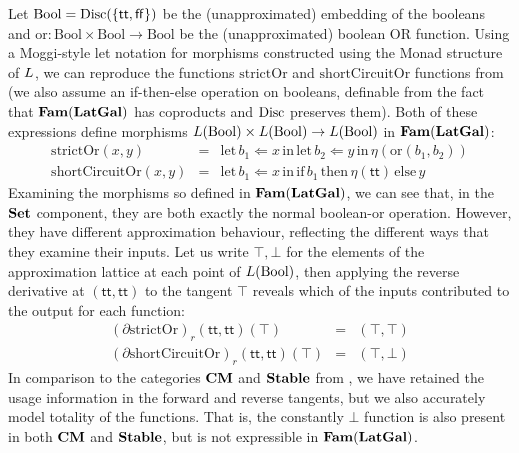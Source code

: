 \newcommand{\Bool}{\mathrm{Bool}}

Let $\Bool = \Disc(\{\mathsf{tt},\mathsf{ff}\})$ be the
(unapproximated) embedding of the booleans and
$\mathrm{or} : \Bool \times \Bool \to \Bool$ be the (unapproximated)
boolean OR function. Using a Moggi-style let notation
\cite{notions-of-computation} for morphisms constructed using the
Monad structure of $L$, we can reproduce the functions
$\mathrm{strictOr}$ and $\mathrm{shortCircuitOr}$ functions from
 (we also assume an if-then-else operation
on booleans, definable from the fact that $\mathbf{Fam}(\mathbf{LatGal})$ has
coproducts and $\mathrm{Disc}$ preserves them). Both of these expressions
define morphisms $\Lift(\Bool) \times \Lift(\Bool) \to \Lift(\Bool)$
in $\mathbf{Fam}(\mathbf{LatGal})$:
\begin{displaymath}
  \begin{array}{lcl}
    \mathrm{strictOr}(x,y)&=&\mathrm{let}\,b_1 \Leftarrow x\,\mathrm{in}\,\mathrm{let}\,b_2 \Leftarrow y\,\mathrm{in}\,\eta(\mathrm{or}(b_1,b_2)) \\
    \mathrm{shortCircuitOr}(x,y)&=&\mathrm{let}\,b_1 \Leftarrow x\,\mathrm{in}\,\mathrm{if}\,b_1\,\mathrm{then}\,\eta(\mathsf{tt})\,\mathrm{else}\,y
  \end{array}
\end{displaymath}
Examining the morphisms so defined in $\mathbf{Fam}(\mathbf{LatGal})$, we can see
that, in the $\mathbf{Set}$ component, they are both exactly the normal
boolean-or operation. However, they have different approximation
behaviour, reflecting the different ways that they examine their
inputs. Let us write $\top,\bot$ for the elements of the approximation
lattice at each point of $\Lift(\Bool)$, then applying the reverse
derivative at $(\mathsf{tt},\mathsf{tt})$ to the tangent $\top$
reveals which of the inputs contributed to the output for each
function:
\begin{displaymath}
  \begin{array}{lcl}
    (\partial \mathrm{strictOr})_r(\mathsf{tt},\mathsf{tt})(\top) &=& (\top, \top)  \\
    (\partial \mathrm{shortCircuitOr})_r(\mathsf{tt},\mathsf{tt})(\top) &=& (\top, \bot)
  \end{array}
\end{displaymath}
In comparison to the categories $\mathbf{CM}$ and $\mathbf{Stable}$ from
, we have retained the usage information in
the forward and reverse tangents, but we also accurately model
totality of the functions. That is, the constantly $\bot$ function is
also present in both $\mathbf{CM}$ and $\mathbf{Stable}$, but is not expressible in
$\mathbf{Fam}(\mathbf{LatGal})$.

